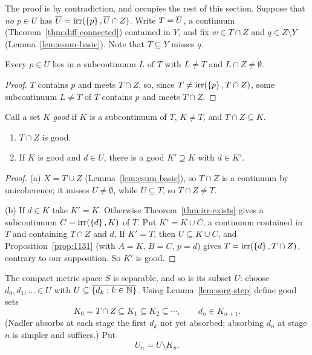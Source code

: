 The proof is by contradiction, and occupies the rest of this section. Suppose that \emph{no}
$p\in U$ has $\overline{U}=\operatorname{irr}(\left\{ p \right\},\overline{U}\cap Z)$. Write $T=\overline{U}$, a continuum
(Theorem~\ref{thm:diff-connected}) contained in $Y$, and fix $w\in T\cap Z$ and $q\in Z\setminus Y$
(Lemma~\ref{lem:esum-basic}). Note that $T\subseteq Y$ misses $q$.

\begin{lemma}\label{lem:sorg-proper}
Every $p\in U$ lies in a subcontinuum $L$ of $T$ with $L\ne T$ and $L\cap Z\ne\emptyset$.
\end{lemma}

\begin{proof}
$T$ contains $p$ and meets $T\cap Z$, so, since $T\ne\operatorname{irr}(\left\{ p \right\},T\cap Z)$, some subcontinuum $L\ne T$
of $T$ contains $p$ and meets $T\cap Z$.
\end{proof}


Call a set $K$ \emph{good} if $K$ is a subcontinuum of $T$, $K\neq T$, and $T\cap Z\subseteq K$.

\begin{lemma}\label{lem:sorg-step}
\begin{enumerate}[label=(\alph*)]
\item $T\cap Z$ is good.
\item If $K$ is good and $d\in U$, there is a good $K'\supseteq K$ with $d\in K'$.
\end{enumerate}
\end{lemma}

\begin{proof}
(a) $X=T\cup Z$ (Lemma~\ref{lem:esum-basic}), so $T\cap Z$ is a continuum by unicoherence; it misses
$U\ne\emptyset$, while $U\subseteq T$, so $T\cap Z\neq T$.

(b) If $d\in K$ take $K'=K$. Otherwise Theorem~\ref{thm:irr-exists} gives a subcontinuum
$C=\operatorname{irr}(\left\{ d \right\},K)$ of $T$. Put $K'=K\cup C$, a continuum contained in $T$ and containing $T\cap Z$ and
$d$. If $K'=T$, then $U\subseteq K\cup C$, and Proposition~\ref{prop:1131} (with $A=K$, $B=C$, $p=d$)
gives $T=\operatorname{irr}(\left\{ d \right\},T\cap Z)$, contrary to our supposition. So $K'$ is good.
\end{proof}


The compact metric space $S$ is separable, and so is its subset $U$: choose $d_0,d_1,\dots\in U$ with
$U\subseteq\overline{\left\{ d_k:k\in\mathbb{N} \right\}}$. Using Lemma~\ref{lem:sorg-step} define good sets
\[
K_0=T\cap Z\subseteq K_1\subseteq K_2\subseteq\cdots,\qquad d_n\in K_{n+1}.
\]
(Nadler absorbs at each stage the first $d_k$ not yet absorbed; absorbing $d_n$ at stage $n$ is
simpler and suffices.) Put
\[
U_n=U\setminus K_n .
\]

